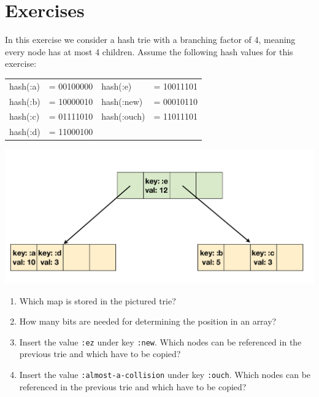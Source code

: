 \documentclass[11pt,a4paper]{article}
\begin{document}
\section{Exercises}
\begin{exercise}

	In this exercise we consider a hash trie with a branching factor of 4,
	meaning every node has at most 4 children.
	Assume the following hash values for this exercise:

    \begin{center}
    \begin{tabular}{l@{}ll@{}l}
        hash(:a)    &= \colorbox{red!15}{00}\colorbox{blue!15}{10}\colorbox{orange!15}{00}\colorbox{green!15}{00} &hash(:e)    &= \colorbox{red!15}{10}\colorbox{blue!15}{01}\colorbox{orange!15}{11}\colorbox{green!15}{01}\\
        hash(:b)    &= \colorbox{red!15}{10}\colorbox{blue!15}{00}\colorbox{orange!15}{00}\colorbox{green!15}{10} &hash(:new)  &= \colorbox{red!15}{00}\colorbox{blue!15}{01}\colorbox{orange!15}{01}\colorbox{green!15}{10}\\
        hash(:c)    &= \colorbox{red!15}{01}\colorbox{blue!15}{11}\colorbox{orange!15}{10}\colorbox{green!15}{10} &hash(:ouch) &= \colorbox{red!15}{11}\colorbox{blue!15}{01}\colorbox{orange!15}{11}\colorbox{green!15}{01}\\
        hash(:d)    &= \colorbox{red!15}{11}\colorbox{blue!15}{00}\colorbox{orange!15}{01}\colorbox{green!15}{00} &\\
    \end{tabular}
    \end{center}

\begin{center}
    \includegraphics[scale=0.4]{hashtrie.pdf}
\end{center}

\begin{enumerate}[label=\alph*)]
\item
	Which map is stored in the pictured trie?
\item
	How many bits are needed for determining the position in an array?
\item
	Insert the value \texttt{:ez} under key \texttt{:new}.
	Which nodes can be referenced in the previous trie and which have to be copied?
\item
	Insert the value \texttt{:almost-a-collision} under key \texttt{:ouch}.
	Which nodes can be referenced in the previous trie and which have to be copied?
\end{enumerate}
\end{exercise}
\end{document}
